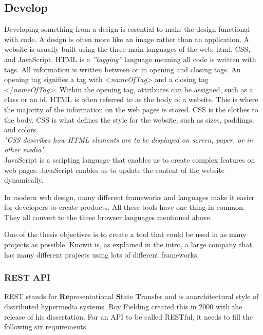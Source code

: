 \subsection{Develop}%
\label{sub:Develop}

Developing something from a design is essential to make the design functional with code. A design is often more like an image rather than an application. A website is usually built using the three main languages of the web: \acrfull{html}, CSS, and JavaScript. HTML is a \textit{''tagging''} language meaning all code is written with tags. All information is written between or in opening and closing tags. An opening tag signifies a tag with  <\textit{nameOfTag}> and a closing tag </\textit{nameOfTag}>. Within the opening tag, attributes can be assigned, such as a class or an id. 
HTML is often referred to as the body of a website. This is where the majority of the information on the web pages is stored. CSS is the clothes to the body. CSS is what defines the style for the website, such as sizes, paddings, and colors.\\
\textit{"CSS describes how HTML elements are to be displayed on screen, paper, or in other media"}\cite{CSSIntroduction}.\\
JavaScript is a scripting language that enables us to create complex features on web pages. JavaScript enables us to update the content of the website dynamically. 

In modern web design, many different frameworks and languages make it easier for developers to create products.  All these tools have one thing in common. They all convert to the three browser languages mentioned above. 

One of the thesis objectives is to create a tool that could be used in as many projects as possible. Knowit is, as explained in the intro, a large company that has many different projects using lots of different frameworks. 


\subsubsection{REST API}%
\label{sub:REST API}
REST stands for \textbf{Re}presentational \textbf{S}tate \textbf{T}ransfer and is anarchitectural style of distributed hypermedia systems. Roy Fielding created this in 2000 with the release of his dissertation\cite{fieldingFieldingDissertationCHAPTER}. For an API to be called RESTful, it needs to fill the following six requirements\cite{fieldingFieldingDissertationCHAPTER,restfulapi.netWhatREST}. 

